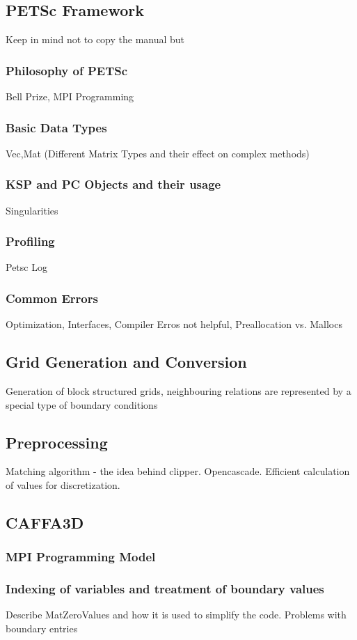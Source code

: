 \documentclass[article,type=msc,colorback,accentcolor=tud2a]{tudthesis}
\begin{document}
    \subsection{PETSc Framework}
      Keep in mind not to copy the manual but
      \subsubsection{Philosophy of PETSc}
        Bell Prize, MPI Programming
      \subsubsection{Basic Data Types}
        Vec,Mat (Different Matrix Types and their effect on complex methods)
      \subsubsection{KSP and PC Objects and their usage}
        Singularities
      \subsubsection{Profiling}
        Petsc Log 
      \subsubsection{Common Errors}
        Optimization, Interfaces, Compiler Erros not helpful, Preallocation vs. Mallocs

    \subsection{Grid Generation and Conversion}
    Generation of block structured grids, neighbouring relations are represented by a special type of boundary conditions
    \subsection{Preprocessing}
    Matching algorithm - the idea behind clipper. Opencascade. Efficient calculation of values for discretization.
    \subsection{CAFFA3D}

      \subsubsection{MPI Programming Model}
      \subsubsection{Indexing of variables and treatment of boundary values}
        Describe MatZeroValues and how it is used to simplify the code. Problems with boundary entries
\end{document}

